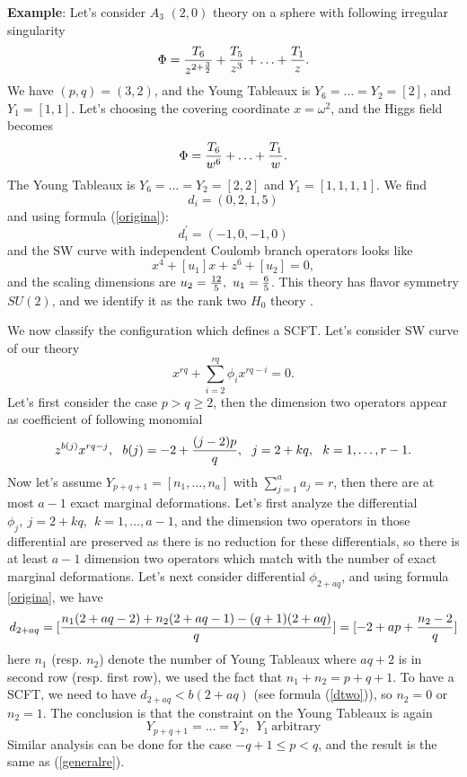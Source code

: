 \documentclass[a4paper,11pt]{article}
\begin{document}
\textbf{Example}: Let's consider  $A_3$ $(2,0)$ theory on a sphere with following irregular singularity 
\begin{equation}
\Phi={T_6\over z^{2+{3\over 2}}}+{T_5\over z^{3}}+\ldots+{T_1\over z}.
\end{equation}
We have $(p,q)=(3,2)$, and the Young Tableaux is $Y_6=\ldots=Y_2=[2]$, and $Y_1=[1,1]$.  Let's choosing the covering coordinate $x=\omega^2$, and the Higgs field becomes
\begin{equation}
\Phi={T_6\over w^6}+\ldots+{T_1\over w}.
\end{equation}
The Young Tableaux is $Y_6=\ldots=Y_2=[2,2]$ and $Y_1=[1,1,1,1]$. We find 
\begin{equation}
d_i=(0, 2, 1, 5)
\end{equation}
and using formula (\ref{origina}):
\begin{equation}
d_i^{'}=(-1,0,-1,0)
\end{equation}
and the SW curve with independent Coulomb branch operators looks like 
\begin{equation}
x^4+ [u_1]x+z^6+[u_2]=0,
\end{equation}
and the scaling dimensions are $u_2={12\over 5},~ u_1={6\over 5}$. This theory has flavor symmetry $SU(2)$, and
we identify it as the rank two $H_0$ theory \cite{Aharony:2007dj}. 


We now classify the configuration which defines a SCFT. Let's consider SW curve of our theory
\begin{equation}
x^{rq}+\sum_{i=2}^{rq} \phi_i x^{rq -i}=0.
\end{equation}
Let's first consider the case $p>q\geq 2$, then
the dimension two operators appear as coefficient of following monomial
\begin{equation}
z^{b(j)}x^{rq -j},~~b(j)=-2+{(j-2)p\over q},~~j=2+k q,~~k=1,\ldots, r-1.
\label{dtwo}
\end{equation}
Now let's assume $Y_{p+q+1}=[n_1, \ldots, n_a]$ with $\sum_{j=1}^a a_j=r$, then there are at most $a-1$ exact marginal deformations. 
Let's first analyze the differential $\phi_j,~j=2+kq,~~k=1,\ldots, a-1$, and the dimension two operators in those 
differential are preserved as there is no reduction for these differentials, so there is at least $a-1$ dimension two operators which 
match with the number of exact marginal deformations. 
Let's next consider differential $\phi_{2+aq}$, and using formula \ref{origina}, we have 
\begin{equation}
d_{2+a q}=[{ n_1(2+aq-2)+n_2(2+aq-1)-(q+1)(2+a q)\over q}]=[-2+ap+{n_2-2\over q}]
\end{equation}
here $n_1$ (resp. $n_2$) denote the number of Young Tableaux where $aq+2$ is in second row (resp. first row),  we used the fact that $n_1+n_2=p+q+1$. 
To have a SCFT, we need to have $d_{2+aq}<b(2+aq)$ (see formula (\ref{dtwo})), so $n_2=0$ or $n_2=1$.   
The conclusion is that the constraint on the Young Tableaux is again
\begin{equation}
Y_{p+q+1}=\ldots=Y_2,~~Y_1~\text{arbitrary}
\label{generalre}
\end{equation} 
Similar analysis  can be done for the case $-q+1\leq p<q$, and the result is the same as (\ref{generalre}). 
\end{document}
